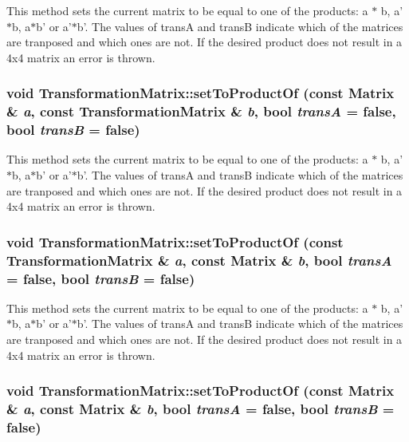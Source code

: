 This method sets the current matrix to be equal to one of the products: a $\ast$ b, a'$\ast$b, a$\ast$b' or a'$\ast$b'. The values of transA and transB indicate which of the matrices are tranposed and which ones are not. If the desired product does not result in a 4x4 matrix an error is thrown. \hypertarget{classCartWheel_1_1Math_1_1TransformationMatrix_a459a4175b579a8dd41140dcef09818a7}{
\subsubsection[{setToProductOf}]{\setlength{\rightskip}{0pt plus 5cm}void TransformationMatrix::setToProductOf (const {\bf Matrix} \& {\em a}, \/  const {\bf TransformationMatrix} \& {\em b}, \/  bool {\em transA} = {\ttfamily false}, \/  bool {\em transB} = {\ttfamily false})}}
\label{classCartWheel_1_1Math_1_1TransformationMatrix_a459a4175b579a8dd41140dcef09818a7}
This method sets the current matrix to be equal to one of the products: a $\ast$ b, a'$\ast$b, a$\ast$b' or a'$\ast$b'. The values of transA and transB indicate which of the matrices are tranposed and which ones are not. If the desired product does not result in a 4x4 matrix an error is thrown. \hypertarget{classCartWheel_1_1Math_1_1TransformationMatrix_af09f5e22d3a79523605c165afa9313f5}{
\subsubsection[{setToProductOf}]{\setlength{\rightskip}{0pt plus 5cm}void TransformationMatrix::setToProductOf (const {\bf TransformationMatrix} \& {\em a}, \/  const {\bf Matrix} \& {\em b}, \/  bool {\em transA} = {\ttfamily false}, \/  bool {\em transB} = {\ttfamily false})}}
\label{classCartWheel_1_1Math_1_1TransformationMatrix_af09f5e22d3a79523605c165afa9313f5}
This method sets the current matrix to be equal to one of the products: a $\ast$ b, a'$\ast$b, a$\ast$b' or a'$\ast$b'. The values of transA and transB indicate which of the matrices are tranposed and which ones are not. If the desired product does not result in a 4x4 matrix an error is thrown. \hypertarget{classCartWheel_1_1Math_1_1TransformationMatrix_aa30793678e416efa275e9ede54650bff}{
\subsubsection[{setToProductOf}]{\setlength{\rightskip}{0pt plus 5cm}void TransformationMatrix::setToProductOf (const {\bf Matrix} \& {\em a}, \/  const {\bf Matrix} \& {\em b}, \/  bool {\em transA} = {\ttfamily false}, \/  bool {\em transB} = {\ttfamily false})}}
